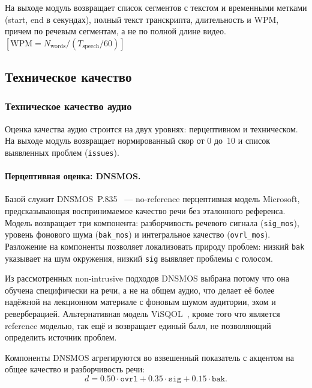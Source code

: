 На выходе модуль возвращает список сегментов с текстом и временными метками
(start, end в секундах), полный текст транскрипта, длительность и WPM, причем по речевым сегментам, а не по полной длине видео.
\(\left[\mathrm{WPM} = N_{\mathrm{words}} / (T_{\mathrm{speech}} / 60)\right]\)

\subsection{Техническое качество}

\subsubsection{Техническое качество аудио}
\label{sec:method-audio}

Оценка качества аудио строится на двух уровнях: перцептивном и техническом.
На выходе модуль возвращает нормированный скор от 0 до~10 и список выявленных проблем (\texttt{issues}).

\paragraph{Перцептивная оценка: DNSMOS.}

Базой служит DNSMOS~P.835~\cite{reddy2022dnsmosp835} — no-reference перцептивная модель Microsoft,
предсказывающая воспринимаемое качество речи без эталонного референса.
Модель возвращает три компонента: разборчивость речевого сигнала (\texttt{sig\_mos}),
уровень фонового шума (\texttt{bak\_mos}) и интегральное качество (\texttt{ovrl\_mos}).
Разложение на компоненты позволяет локализовать природу проблем:
низкий \texttt{bak} указывает на шум окружения, низкий \texttt{sig} выявляет проблемы с голосом.

Из рассмотренных non-intrusive подходов DNSMOS выбрана потому что она обучена
специфически на речи, а не на общем аудио, что делает её более надёжной
на лекционном материале с фоновым шумом аудитории, эхом и реверберацией.
Альтернативная модель ViSQOL~\cite{chinen2020visqol}, кроме того что является reference моделью, так ещё и возвращает единый балл,
не позволяющий определить источник проблем.

Компоненты DNSMOS агрегируются во взвешенный показатель с акцентом на общее качество и разборчивость речи:
\begin{equation}
d = 0.50 \cdot \texttt{ovrl} + 0.35 \cdot \texttt{sig} + 0.15 \cdot \texttt{bak}.
\end{equation}

